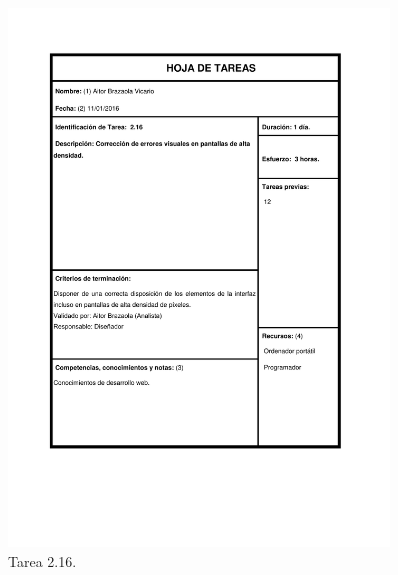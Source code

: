 \documentclass{DeustoFDP}
\begin{document}
\begin{figure}[H]
    \centering
    \includegraphics[width=0.9\textwidth]{fig/Tareas/216}
    \caption{Tarea 2.16.}
    \label{fig:t216}
\end{figure}
\end{document}
